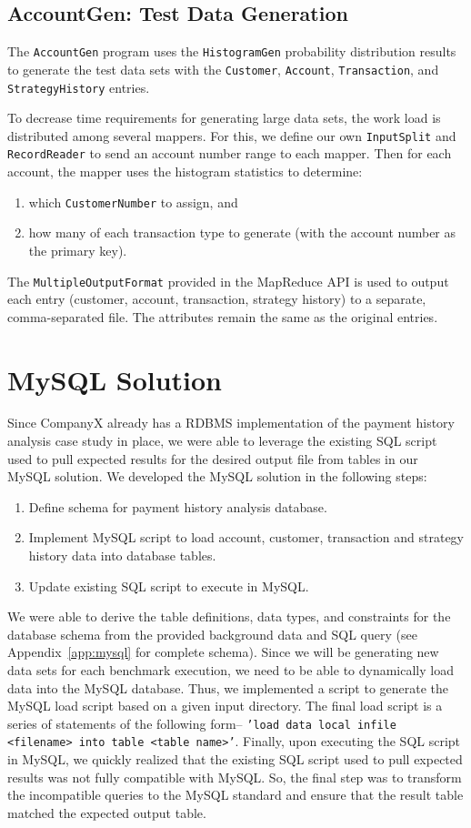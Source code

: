 \subsection{AccountGen: Test Data Generation}
The {\tt AccountGen} program uses the {\tt HistogramGen} probability distribution results to generate the test data sets with the {\tt Customer}, {\tt Account}, {\tt Transaction}, and {\tt StrategyHistory} entries. 

To decrease time requirements for generating large data sets, the work load is distributed among several mappers. For this, we define our own {\tt InputSplit} and {\tt RecordReader} to send an account number range to each mapper. Then for each account, the mapper uses the histogram statistics to determine:
\begin{enumerate}
 \item which {\tt CustomerNumber} to assign, and
 \item how many of each transaction type to generate (with the account number as the primary key).
\end{enumerate}

The {\tt MultipleOutputFormat} provided in the MapReduce API is used to output each entry (customer, account, transaction, strategy history) to a separate, comma-separated file. The attributes remain the same as the original entries. 

\section{MySQL Solution}
Since CompanyX already has a RDBMS implementation of the payment history analysis case study in place, we were able to leverage the existing SQL script used to pull expected results for the desired output file from tables in our MySQL solution. We developed the MySQL solution in the following steps:
\begin{enumerate}
 \item Define schema for payment history analysis database.
 \item Implement MySQL script to load account, customer, transaction and strategy history data into database tables.
 \item Update existing SQL script to execute in MySQL.
\end{enumerate}
We were able to derive the table definitions, data types, and constraints for the database schema from the provided background data and SQL query (see Appendix~\ref{app:mysql} for complete schema). Since we will be generating new data sets for each benchmark execution, we need to be able to dynamically load data into the MySQL database. Thus, we implemented a script to generate the MySQL load script based on a given input directory. The final load script is a series of statements of the following form-- \texttt{'load data local infile <filename>  into table <table name>'}. Finally, upon executing the SQL script in MySQL, we quickly realized that the existing SQL script used to pull expected results was not fully compatible with MySQL. So, the final step was to transform the incompatible queries to the MySQL standard and ensure that the result table matched the expected output table.

